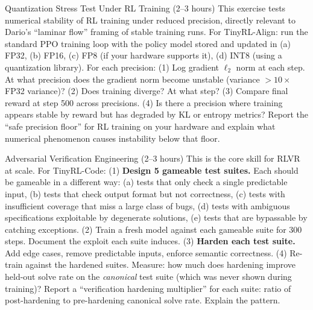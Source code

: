 \begin{exercise}{Quantization Stress Test Under RL Training (2--3 hours)}
This exercise tests numerical stability of RL training under reduced precision, directly relevant to Dario's ``laminar flow'' framing of stable training runs. For TinyRL-Align: run the standard PPO training loop with the policy model stored and updated in (a) FP32, (b) FP16, (c) FP8 (if your hardware supports it), (d) INT8 (using a quantization library). For each precision: (1) Log gradient $\ell_2$ norm at each step. At what precision does the gradient norm become unstable (variance $>10\times$ FP32 variance)? (2) Does training diverge? At what step? (3) Compare final reward at step 500 across precisions. (4) Is there a precision where training appears stable by reward but has degraded by KL or entropy metrics? Report the ``safe precision floor'' for RL training on your hardware and explain what numerical phenomenon causes instability below that floor.
\end{exercise}

\begin{exercise}{Adversarial Verification Engineering (2--3 hours)}
This is the core skill for RLVR at scale. For TinyRL-Code: (1) \textbf{Design 5 gameable test suites.} Each should be gameable in a different way: (a) tests that only check a single predictable input, (b) tests that check output format but not correctness, (c) tests with insufficient coverage that miss a large class of bugs, (d) tests with ambiguous specifications exploitable by degenerate solutions, (e) tests that are bypassable by catching exceptions. (2) Train a fresh model against each gameable suite for 300 steps. Document the exploit each suite induces. (3) \textbf{Harden each test suite.} Add edge cases, remove predictable inputs, enforce semantic correctness. (4) Re-train against the hardened suites. Measure: how much does hardening improve held-out solve rate on the \textit{canonical} test suite (which was never shown during training)? Report a ``verification hardening multiplier'' for each suite: ratio of post-hardening to pre-hardening canonical solve rate. Explain the pattern.
\end{exercise}

